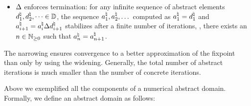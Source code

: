 \begin{description}
\begin{definition}[Narrowing]
\begin{itemize}
      \item $\Delta$ enforces termination: for any infinite sequence of abstract elements $d^\natural_1, d^\natural_2, \dots \in \mathbb{D}$, the sequence $a^\natural_1, a^\natural_2, \dots$ computed as $a^\natural_1 = d^\natural_1$ and $a^\natural_{i+1} = a^\natural_i \Delta d^\natural_{i+1}$ stabilizes after a finite number of iterations, \ie, there exists an $n \in \mathbb{N}_{\ge0}$ such that $a^\natural_n = a^\natural_{n+1}$.
    \end{itemize}
  \end{definition}
  The narrowing ensures convergence to a better approximation of the fixpoint than only by using the widening. Generally, the total number of abstract iterations is much smaller than the number of concrete iterations.
  \end{description}

Above we exemplified all the components of a numerical abstract domain. Formally, we define an abstract domain as follows:

